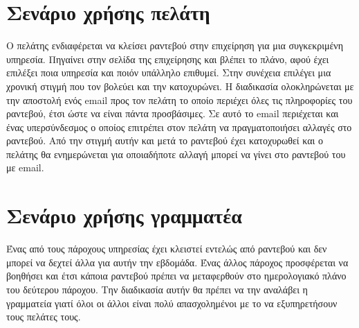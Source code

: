 \section{Σενάριο χρήσης πελάτη}
Ο πελάτης ενδιαφέρεται να κλείσει ραντεβού στην επιχείρηση για μια συγκεκριμένη υπηρεσία. Πηγαίνει στην σελίδα της επιχείρησης και βλέπει το πλάνο, αφού έχει επιλέξει ποια υπηρεσία και ποιόν υπάλληλο επιθυμεί. Στην συνέχεια επιλέγει μια χρονική στιγμή που τον βολεύει και την κατοχυρώνει. Η διαδικασία ολοκληρώνεται με την αποστολή ενός email προς τον πελάτη το οποίο περιέχει όλες τις πληροφορίες του ραντεβού, έτσι ώστε να είναι πάντα προσβάσιμες. Σε αυτό το email περιέχεται και ένας υπερσύνδεσμος ο οποίος επιτρέπει στον πελάτη να πραγματοποιήσει αλλαγές στο ραντεβού. Από την στιγμή αυτήν και μετά το ραντεβού έχει κατοχυρωθεί και ο πελάτης θα ενημερώνεται για οποιαδήποτε αλλαγή μπορεί να γίνει στο ραντεβού του με email.

\section{Σενάριο χρήσης γραμματέα}
Ένας από τους πάροχους υπηρεσίας έχει κλειστεί εντελώς από ραντεβού και δεν μπορεί να δεχτεί άλλα για αυτήν την εβδομάδα. Ένας άλλος πάροχος προσφέρεται να βοηθήσει και έτσι κάποια ραντεβού πρέπει να μεταφερθούν στο ημερολογιακό πλάνο του δεύτερου πάροχου. Την διαδικασία αυτήν θα πρέπει να την αναλάβει η γραμματεία γιατί όλοι οι άλλοι είναι πολύ απασχολημένοι με το να εξυπηρετήσουν τους πελάτες τους.